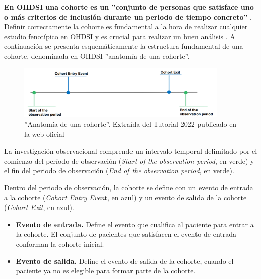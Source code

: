 
\textbf{En OHDSI una cohorte es un ''conjunto de personas que satisface uno o más criterios de inclusión durante un periodo de tiempo concreto''} \cite{OHDSIbook}. Definir correctamente la cohorte es fundamental a la hora de realizar cualquier estudio fenotípico en OHDSI y es crucial para realizar un buen análisis \cite{hripcsak2018high}. A continuación se presenta esquemáticamente la estructura fundamental de una cohorte, denominada en OHDSI ''anatomía de una cohorte''.

\begin{figure}[H]
\centering
\includegraphics[width=0.90\textwidth]{figures/cohortAnatomy.png}
     \caption{''Anatomía de una cohorte''. Extraída del Tutorial 2022 publicado en la web oficial \cite{OHDSIwebsite}}
    \label{fig:cohortAnatomy}
\end{figure}

La investigación observacional comprende un intervalo temporal delimitado por el comienzo del período de  observación (\textit{Start of the observation period}, en verde) y el fin del periodo de observación (\textit{End of the observation period}, en verde).

Dentro del periodo de observación, la cohorte se define con un  evento de entrada a la cohorte (\textit{Cohort Entry Even}t, en azul) y un evento de salida de la cohorte (\textit{Cohort Exit}, en azul). 

\begin{itemize}

    \item \textbf{Evento de entrada.} Define el evento que cualifica al paciente para entrar a la cohorte. El conjunto de pacientes que satisfacen el evento de entrada conforman la cohorte inicial. 

    \item \textbf{Evento de salida.} Define el evento de salida de la cohorte, cuando el paciente ya no es elegible para formar parte de la cohorte.

\end{itemize}

